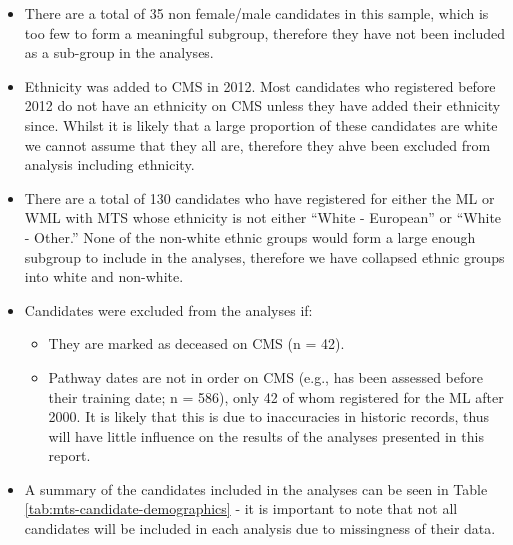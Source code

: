 \documentclass[
  12pt,
  a4paper,
]{book}
\providecommand{\tightlist}{%
  \setlength{\itemsep}{0pt}\setlength{\parskip}{0pt}}
\begin{document}
\begin{itemize}
\tightlist
\item
  There are a total of 35 non female/male candidates in this sample, which is too few to form a meaningful subgroup, therefore they have not been included as a sub-group in the analyses.
\item
  Ethnicity was added to CMS in 2012. Most candidates who registered before 2012 do not have an ethnicity on CMS unless they have added their ethnicity since. Whilst it is likely that a large proportion of these candidates are white we cannot assume that they all are, therefore they ahve been excluded from analysis including ethnicity.
\item
  There are a total of 130 candidates who have registered for either the ML or WML with MTS whose ethnicity is not either ``White - European'' or ``White - Other.'' None of the non-white ethnic groups would form a large enough subgroup to include in the analyses, therefore we have collapsed ethnic groups into white and non-white.
\item
  Candidates were excluded from the analyses if:

  \begin{itemize}
  \tightlist
  \item
    They are marked as deceased on CMS (n = 42).
  \item
    Pathway dates are not in order on CMS (e.g., has been assessed before their training date; n = 586), only 42 of whom registered for the ML after 2000. It is likely that this is due to inaccuracies in historic records, thus will have little influence on the results of the analyses presented in this report.
  \end{itemize}
\item
  A summary of the candidates included in the analyses can be seen in Table \ref{tab:mts-candidate-demographics} - it is important to note that not all candidates will be included in each analysis due to missingness of their data.
\end{itemize}
\end{document}

